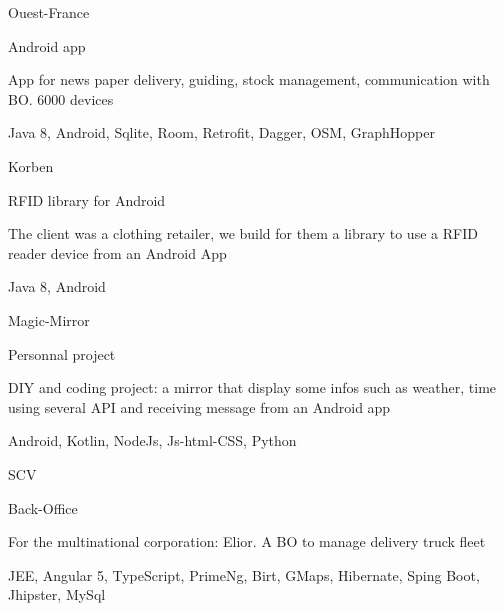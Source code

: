 

\begin{cventries}

  \cventry
  
    {Ouest-France} %
    {} %
    {} %
    {
      \begin{cvitems} %
        \item {Android app }
        \item{App for news paper delivery, guiding, stock management, communication with BO. 6000 devices}
        \item{ Java 8, Android, Sqlite, Room, Retrofit, Dagger, OSM, GraphHopper}
        \par
      \end{cvitems}
    }
  
    {Korben} %
    {} %
    {} %
    {
      \begin{cvitems} %
        \item {RFID library for Android}
        \item{The client was a clothing retailer,  we build for them a library to use a RFID reader device from an Android App}
        \item{Java 8, Android}
      \end{cvitems}
    }
  
    {Magic-Mirror} %
    {} %
    {} %
    {
      \begin{cvitems} %
        \item {Personnal project}
        \item{DIY and coding project: a mirror that display some infos such as weather, time using several API and receiving message from an Android app}
        \item{Android, Kotlin, NodeJs, Js-html-CSS, Python}
      \end{cvitems}
    }
  
    {SCV} %
    {} %
    {} %
    {
      \begin{cvitems} %
        \item {Back-Office}
        \item{For the multinational corporation: Elior. A BO to manage delivery truck fleet  }
        \item{JEE, Angular 5, TypeScript, PrimeNg, Birt, GMaps, Hibernate, Sping Boot, Jhipster, MySql}
      \end{cvitems}
    }
  

\end{cventries}
